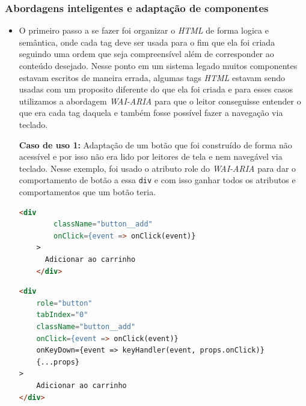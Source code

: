 \subsubsection{Abordagens inteligentes e adaptação de componentes}
{\begin{itemize}
    \item O primeiro passo a se fazer foi organizar o \textit{HTML} \cite{HTML} de forma logica e semântica, onde cada tag deve ser usada para o fim que ela foi criada seguindo uma ordem que seja compreensível além de corresponder ao conteúdo desejado. Nesse ponto em um sistema legado muitos componentes estavam escritos de maneira errada, algumas tags \textit{HTML} \cite{HTML} estavam sendo usadas com um proposito diferente do que ela foi criada e para esses casos utilizamos a abordagem \textit{WAI-ARIA} \cite{WAI-ARIA} para que o leitor conseguisse entender o que era cada tag daquela e também fosse possível fazer a navegação via teclado.

\newpage

{\textbf{Caso de uso 1:} Adaptação de um botão que foi construído de forma não acessível e por isso não era lido por leitores de tela e nem navegável via teclado. Nesse exemplo, foi usado o atributo role do \textit{WAI-ARIA}\cite{WAI-ARIA} para dar o comportamento de botão a essa \lstinline{div} e com isso ganhar todos os atributos e comportamentos que um botão teria.

\begin{lstlisting}[language=html, caption=Componente de botão antes de receber boas praticas e acessibilidade]
    <div
        className="button__add"
        onClick={event => onClick(event)}
    >
      Adicionar ao carrinho 
    </div>
\end{lstlisting}}
{\begin{lstlisting}[language=html,caption=Adaptação do componente de botão usando \textit{WAI-ARIA}]
<div 
    role="button" 
    tabIndex="0" 
    className="button__add"
    onClick={event => onClick(event)}
    onKeyDown={event => keyHandler(event, props.onClick)}
    {...props}
>
    Adicionar ao carrinho
</div>
 
\end{lstlisting}}


\end{itemize}}
